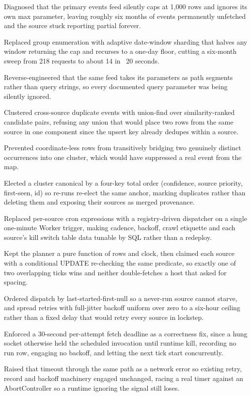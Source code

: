 \documentclass[letterpaper,11pt]{article}
\newcommand{\resumeItem}[1]{
  \item\small{
    {#1 \vspace{-2pt}}
  }
}
\begin{document}
            \resumeItem{Diagnosed that the primary events feed silently caps at 1,000 rows and ignores its own max parameter, leaving roughly six months of events permanently unfetched and the source stuck reporting partial forever.}
            \resumeItem{Replaced group enumeration with adaptive date-window sharding that halves any window returning the cap and recurses to a one-day floor, cutting a six-month sweep from 218 requests to about 14 in ~20 seconds.}
            \resumeItem{Reverse-engineered that the same feed takes its parameters as path segments rather than query strings, so every documented query parameter was being silently ignored.}
            \resumeItem{Clustered cross-source duplicate events with union-find over similarity-ranked candidate pairs, refusing any union that would place two rows from the same source in one component since the upsert key already dedupes within a source.}
            \resumeItem{Prevented coordinate-less rows from transitively bridging two genuinely distinct occurrences into one cluster, which would have suppressed a real event from the map.}
            \resumeItem{Elected a cluster canonical by a four-key total order (confidence, source priority, first-seen, id) so re-runs re-elect the same anchor, marking duplicates rather than deleting them and exposing their sources as merged provenance.}
            \resumeItem{Replaced per-source cron expressions with a registry-driven dispatcher on a single one-minute Worker trigger, making cadence, backoff, crawl etiquette and each source's kill switch table data tunable by SQL rather than a redeploy.}
            \resumeItem{Kept the planner a pure function of rows and clock, then claimed each source with a conditional UPDATE re-checking the same predicate, so exactly one of two overlapping ticks wins and neither double-fetches a host that asked for spacing.}
            \resumeItem{Ordered dispatch by last-started-first-null so a never-run source cannot starve, and spread retries with full-jitter backoff uniform over zero to a six-hour ceiling rather than a fixed delay that would retry every source in lockstep.}
            \resumeItem{Enforced a 30-second per-attempt fetch deadline as a correctness fix, since a hung socket otherwise held the scheduled invocation until runtime kill, recording no run row, engaging no backoff, and letting the next tick start concurrently.}
            \resumeItem{Raised that timeout through the same path as a network error so existing retry, record and backoff machinery engaged unchanged, racing a real timer against an AbortController so a runtime ignoring the signal still loses.}
\end{document}
